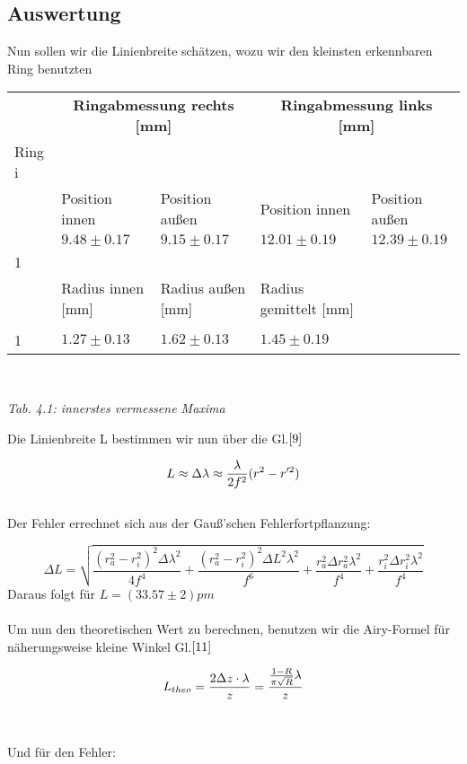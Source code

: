 \subsection{Auswertung}
Nun sollen wir die Linienbreite schätzen, wozu wir den kleinsten erkennbaren Ring benutzten 
\\

\begin{tabular}{l|l|l|l|l}
 & \multicolumn{2}{c|}{\textbf{Ringabmessung rechts [mm]}} & \multicolumn{2}{c}{\textbf{Ringabmessung links [mm]}} \\
Ring i & & & & \\
		& Position innen & Position außen & Position innen & Position außen\\	
\hline
 & $9.48\pm 0.17$ & $9.15\pm 0.17$ & $12.01\pm 0.19$ & $12.39\pm 0.19$ \\
1 & & & & \\
& Radius innen [mm] & Radius außen [mm] & Radius gemittelt [mm] &\\ \hline
& & &  \\
1 & $1.27\pm 0.13$ & $1.62\pm 0.13$ & $1.45\pm 0.19$\\
\end{tabular}\\
\begin{center}
\it Tab. 4.1: innerstes vermessene Maxima\\
\end{center}

Die Linienbreite L bestimmen wir nun über die Gl.$\eqref{9}$

\begin{equation}\notag
L\approx \Delta \lambda \approx \frac {\lambda}{2f^2} (r^2 - r'^2)
\end{equation}\\
Der Fehler errechnet sich aus der Gauß'schen Fehlerfortpflanzung:

\begin{equation}
\Delta L=\sqrt{\frac{(r_{a}^2-r_{i}^2)^2\Delta \lambda^2}{4f^4}+\frac{(r_{a}^2-r_{i}^2)^2\Delta L^2\lambda^2}{f^6}+\frac{r_{a}^2\Delta r_{a}^2\lambda^2}{f^4}+\frac{r_{i}^2\Delta r_{i}^2\lambda^2}{f^4}}
\end{equation}
Daraus folgt für $L=(33.57\pm 2)pm$\\
\\
Um nun den theoretischen Wert zu berechnen, benutzen wir die Airy-Formel für näherungsweise kleine Winkel Gl.$\eqref{11}$

\begin{equation}\notag
L_{theo}=\frac{2 \Delta z\cdot \lambda}{z}=\frac{\frac {1-R}{\pi \sqrt {R}}\lambda}{z} 
\end{equation}\\
\\
Und für den Fehler:

